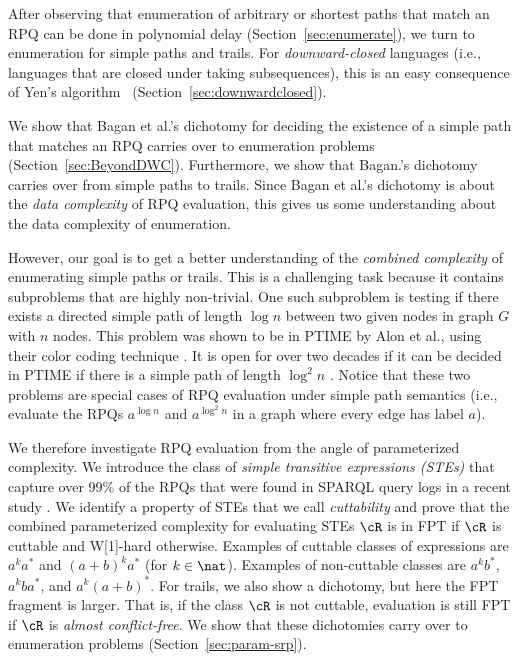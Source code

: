 \documentclass[a4paper,english]{lipics-v2016}
\theoremstyle{plain}
\begin{document}
\begin{compactenum}
\item After observing that enumeration of arbitrary or shortest
  paths that match an RPQ can be done in polynomial delay
  (Section~\ref{sec:enumerate}), we turn to enumeration for simple
  paths and trails. For
  \emph{downward-closed} languages (i.e., languages that are closed
  under taking subsequences), this is an easy consequence of
  Yen's algorithm~\cite{yen} (Section~\ref{sec:downwardclosed}).
\item We show that Bagan et al.'s dichotomy for deciding the existence
  of a simple path that matches an RPQ \cite{bagan} carries over to
  enumeration problems (Section~\ref{sec:BeyondDWC}). Furthermore, we
  show that Bagan.'s dichotomy carries over from simple paths to
  trails.  Since Bagan et al.'s dichotomy is about the \emph{data
    complexity} of RPQ evaluation, this gives us some understanding
  about the data complexity of enumeration.
\item However, our goal is to get a better understanding of the
  \emph{combined complexity} of enumerating simple paths or trails. This is a
  challenging task because it contains subproblems that are highly
  non-trivial. One such subproblem is testing if there exists a
  directed simple path of length $\log n$ between two given nodes in graph
  $G$ with $n$ nodes. This problem was shown to be in PTIME by Alon et al., using
  their color coding technique \cite{AlonYZ-jacm95}.  It is open for
  over two decades if it can be decided in
  PTIME if there is a simple path of length $\log^2 n$ \cite{AlonYZ-jacm95}.
  Notice that these two problems are special cases of RPQ evaluation under
  simple path semantics (i.e., evaluate the RPQs $a^{\log n}$ and
  $a^{\log^2 n}$ in a graph where every edge has label $a$).

  We therefore investigate RPQ evaluation from the angle of
  parameterized complexity. We introduce the class of \emph{simple
    transitive expressions (STEs)} that capture over 99\% of the RPQs
  that were found in SPARQL query logs in a recent study
  \cite{BonifatiMT-corr17}. We identify a property of STEs that we
  call \emph{cuttability} and prove that the combined parameterized
  complexity for evaluating STEs $\cR$ is in FPT if $\cR$ is cuttable
  and W[1]-hard otherwise. Examples of cuttable classes of expressions
  are $a^k a^*$ and $(a+b)^k a^*$ (for $k \in \nat$).  Examples of
  non-cuttable classes are $a^k b^*$, $a^k b a^*$, and
  $a^k(a+b)^*$. For trails, we also show a dichotomy, but here the FPT
  fragment is larger. That is, if the class $\cR$ is not cuttable,
  evaluation is still FPT if $\cR$ is \emph{almost conflict-free}.  We
  show that these dichotomies carry over to enumeration problems
  (Section~\ref{sec:param-srp}).


\end{compactenum}
\end{document}
